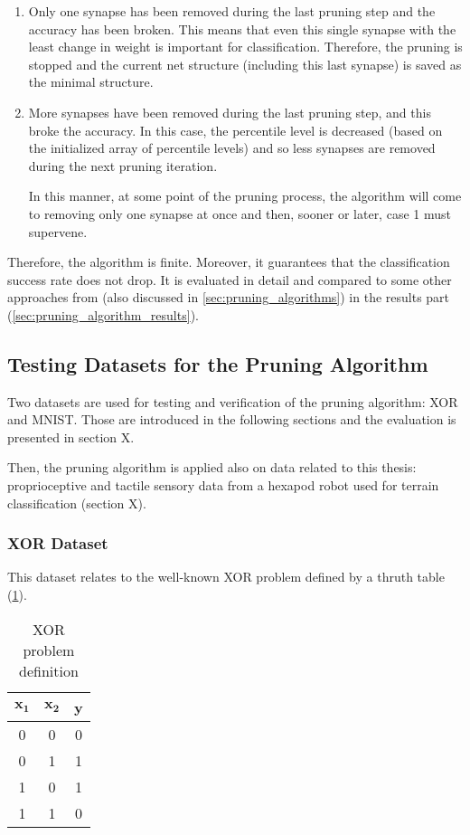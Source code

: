 \begin{enumerate}
\item Only one synapse has been removed during the last pruning step and the accuracy has been broken. This means that even this single synapse with the least change in weight is important for classification. Therefore, the pruning is stopped and the current net structure (including this last synapse) is saved as the minimal structure.
\item More synapses have been removed during the last pruning step, and this broke the accuracy. In this case, the percentile level is decreased (based on the initialized array of percentile levels) and so less synapses are removed during the next pruning iteration.

In this manner, at some point of the pruning process, the algorithm will come to removing only one synapse at once and then, sooner or later, case 1 must supervene.
\end{enumerate}

Therefore, the algorithm is finite. Moreover, it guarantees that the classification success rate does not drop. It is evaluated in detail and compared to some other approaches from \citep{article:10:pa} (also discussed in \cref{sec:pruning_algorithms}) in the results part (\cref{sec:pruning_algorithm_results}).

\subsection{Testing Datasets for the Pruning Algorithm}
Two datasets are used for testing and verification of the pruning algorithm: XOR and MNIST. Those are introduced in the following sections and the evaluation is presented in section X.

Then, the pruning algorithm is applied also on data related to this thesis: proprioceptive and tactile sensory data from a hexapod robot used for terrain classification (section X).

\subsubsection*{XOR Dataset}
This dataset relates to the well-known XOR problem defined by a thruth table (\cref{tab:xor}).

\begin{table}[H]
\centering
\caption{XOR problem definition}
\label{tab:xor}
\begin{tabular}{|c|c|c|}
\hline
$ \mathbf{x_1} $ & $ \mathbf{x_2} $ & \textbf{y} \\ \hline
0           & 0           & 0          \\ \hline
0           & 1           & 1          \\ \hline
1           & 0           & 1          \\ \hline
1           & 1           & 0          \\ \hline
\end{tabular}
\end{table}

